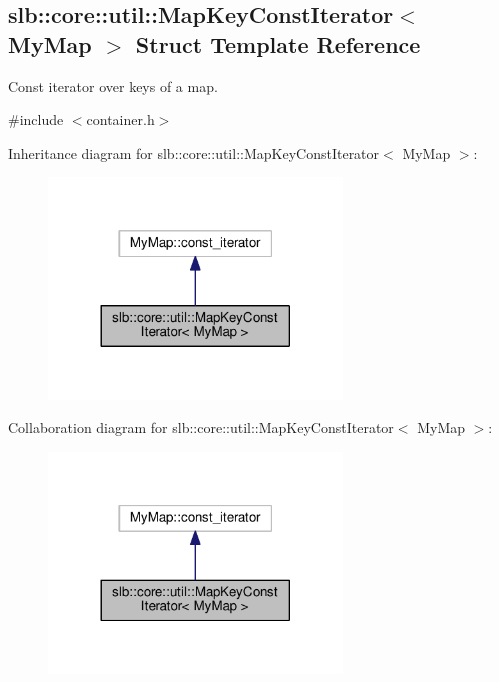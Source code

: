 \hypertarget{structslb_1_1core_1_1util_1_1MapKeyConstIterator}{}\subsection{slb\+:\+:core\+:\+:util\+:\+:Map\+Key\+Const\+Iterator$<$ My\+Map $>$ Struct Template Reference}
\label{structslb_1_1core_1_1util_1_1MapKeyConstIterator}


Const iterator over keys of a map.  




{\ttfamily \#include $<$container.\+h$>$}



Inheritance diagram for slb\+:\+:core\+:\+:util\+:\+:Map\+Key\+Const\+Iterator$<$ My\+Map $>$\+:\nopagebreak
\begin{figure}[H]
\begin{center}
\leavevmode
\includegraphics[width=221pt]{structslb_1_1core_1_1util_1_1MapKeyConstIterator__inherit__graph}
\end{center}
\end{figure}


Collaboration diagram for slb\+:\+:core\+:\+:util\+:\+:Map\+Key\+Const\+Iterator$<$ My\+Map $>$\+:\nopagebreak
\begin{figure}[H]
\begin{center}
\leavevmode
\includegraphics[width=221pt]{structslb_1_1core_1_1util_1_1MapKeyConstIterator__coll__graph}
\end{center}
\end{figure}
